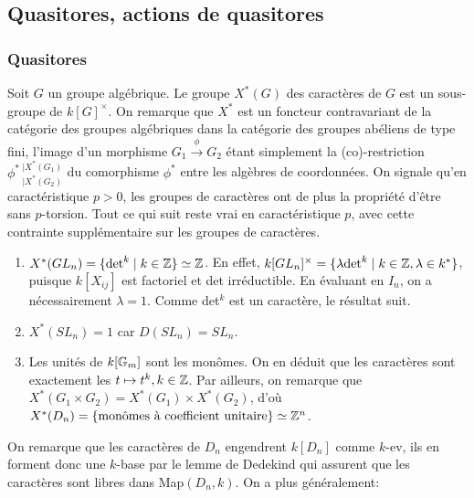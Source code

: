 \subsection{Quasitores, actions de quasitores}

\subsubsection{Quasitores}
Soit $G$ un groupe algébrique. Le groupe $X^*(G)$ des caractères de $G$ est un sous-groupe de $k[G]^\times$. On remarque que $X^*$ est un foncteur contravariant de la catégorie des groupes algébriques dans la catégorie des groupes abéliens de type fini, l'image d'un morphisme $G_1\xrightarrow{\phi}G_2$ étant simplement la (co)-restriction $\phi^* \,_{|X^*(G_2)}^{|X^*(G_1)}$ du comorphisme $\phi^*$ entre les algèbres de coordonnées. On signale qu'en caractéristique $p>0$, les groupes de caractères ont de plus la propriété d'être sans $p$-torsion. Tout ce qui suit reste vrai en caractéristique $p$, avec cette contrainte supplémentaire sur les groupes de caractères.

\begin{ex}
\begin{enumerate}
\item $X^*(GL_n)=\lbrace \textrm{det}^k\mid k\in \mathbb{Z} \rbrace\simeq\mathbb{Z}$. En effet, $k[GL_n]^\times =\lbrace \lambda\textrm{det}^k\mid k\in \mathbb{Z}, \lambda\in k^* \rbrace$, puisque $k[X_{ij}]$ est factoriel et det irréductible. En évaluant en $I_n$, on a nécessairement $\lambda=1$. Comme det$^k$ est un caractère, le résultat suit.
\item $X^*(SL_n)={1}$ car $D(SL_n)=SL_n$.
\item Les unités de $k[\mathbb{G}_m]$ sont les monômes. On en déduit que les caractères sont exactement les $t\mapsto t^k, k\in \mathbb{Z}$. Par ailleurs, on remarque que $X^*(G_1\times G_2)=X^*(G_1)\times X^*(G_2)$, d'où $X^*(D_n)=\lbrace \textrm{monômes à coefficient unitaire} \rbrace \simeq \mathbb{Z}^n$.
\end{enumerate}
\end{ex}

On remarque que les caractères de $D_n$ engendrent $k[D_n]$ comme $k$-ev, ils en forment donc une $k$-base par le lemme de Dedekind qui assurent que les caractères sont libres dans Map$(D_n, k)$. On a plus généralement:

